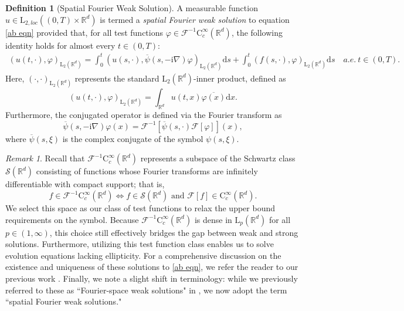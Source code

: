 \documentclass[11pt,reqno]{amsart}
\theoremstyle{definition}
\newtheorem{defn}[thm]{Definition}
\theoremstyle{remark}
\newtheorem{rem}[thm]{Remark}
\newcommand\bR{\mathbb{R}}
\numberwithin{equation}{section}
\begin{document}
\begin{defn}[Spatial Fourier Weak Solution]
									\label{space weak solution}
A measurable function $u \in \mathrm{L}_{2,loc}((0,T) \times \mathbb{R}^d)$ is termed a  \emph{spatial Fourier weak solution} to equation \eqref{ab eqn} provided that, for all test functions $\varphi \in \mathcal{F}^{-1}\mathrm{C}_c^\infty(\mathbb{R}^d)$, the following identity holds for almost every $t \in (0,T)$:
\begin{align}
										\label{weak formulation}
\left(u(t,\cdot),\varphi\right)_{\mathrm{L}_2(\bR^d)} =  \int_0^t \left(u(s,\cdot) , \overline \psi(s,-\mathrm{i}\nabla)\varphi \right)_{\mathrm{L}_2(\bR^d)} \mathrm{d}s 
+ \int_0^t \left( f(s,\cdot),\varphi\right)_{\mathrm{L}_2(\bR^d)} \mathrm{d}s
\quad a.e.~t\in (0,T).
\end{align}
Here, $(\cdot,\cdot)_{\mathrm{L}_2(\mathbb{R}^d)}$ represents the standard $\mathrm{L}_2(\mathbb{R}^d)$-inner product, defined as
$$
\left(u(t,\cdot),\varphi\right)_{\mathrm{L}_2(\mathbb{R}^d)} = \int_{\mathbb{R}^d} u(t,x) \overline{\varphi(x)} \mathrm{d}x.
$$ 
Furthermore, the conjugated operator is defined via the Fourier transform as
$$
\overline\psi(s,-\mathrm{i}\nabla)\varphi(x)= \mathcal{F}^{-1}\left[\overline \psi(s,\cdot) \mathcal{F}[\varphi] \right](x), 
$$ 
where $\overline\psi(s,\xi)$ is the complex conjugate of the symbol $\psi(s,\xi)$.
\end{defn}

\begin{rem}
Recall that $\mathcal{F}^{-1}\mathrm{C}_c^\infty(\mathbb{R}^d)$ represents a subspace of the Schwartz class $\mathcal{S}(\mathbb{R}^d)$ consisting of functions whose Fourier transforms are infinitely differentiable with compact support; that is,
$$
f \in \mathcal{F}^{-1}\mathrm{C}_c^\infty(\mathbb{R}^d) \iff f \in \mathcal{S}(\mathbb{R}^d) \text{ and } \mathcal{F}[f] \in \mathrm{C}_c^\infty(\mathbb{R}^d).
$$
We select this space as our class of test functions to relax the upper bound requirements on the symbol. 
Because $\mathcal{F}^{-1}\mathrm{C}_c^\infty(\mathbb{R}^d)$ is dense in $\mathrm{L}_p(\mathbb{R}^d)$ for all $p \in (1,\infty)$, this choice still effectively bridges the gap between weak and strong solutions. 
Furthermore, utilizing this test function class enables us to solve evolution equations lacking ellipticity. 
For a comprehensive discussion on the existence and uniqueness of these solutions to \eqref{ab eqn}, we refer the reader to our previous work \cite{CK 2024, CK 2024-2}. 
Finally, we note a slight shift in terminology: while we previously referred to these as ``Fourier-space weak solutions" in \cite{CK 2024, CK 2024-2}, we now adopt the term ``spatial Fourier weak solutions."




\end{rem}
\end{document}
